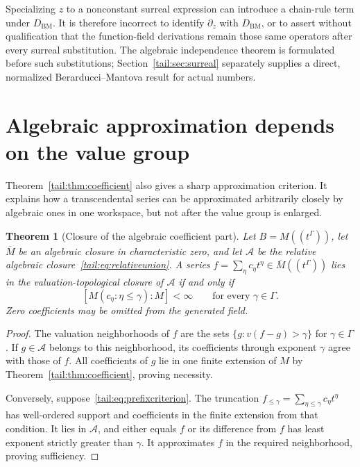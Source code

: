\documentclass[11pt,a4paper]{article}
\numberwithin{equation}{section}
\newtheorem{theorem}{Theorem}[section]
\theoremstyle{definition}
\theoremstyle{remark}
\newcommand{\BM}{D_{\mathrm{BM}}}
\begin{document}
Specializing $z$ to a nonconstant surreal expression can introduce a
chain-rule term under $\BM$. It is therefore incorrect to identify
$\partial_z$ with $\BM$, or to assert without qualification that the
function-field derivations remain those same operators after every
surreal substitution. The algebraic independence theorem is formulated
before such substitutions; Section~\ref{tail:sec:surreal} separately supplies
a direct, normalized Berarducci--Mantova result for actual numbers.

\section{Algebraic approximation depends on the value group}\label{tail:sec:approx}

Theorem~\ref{tail:thm:coefficient} also gives a sharp approximation criterion.
It explains how a transcendental series can be approximated arbitrarily
closely by algebraic ones in one workspace, but not after the value group
is enlarged.

\begin{theorem}[Closure of the algebraic coefficient part]\label{tail:thm:closure}
Let $B=M((t^\Gamma))$, let $\overline M$ be an algebraic closure in
characteristic zero, and let $\mathcal A$ be the relative algebraic
closure~\eqref{tail:eq:relativeunion}. A series
$f=\sum_\eta c_\eta t^\eta\in\overline M((t^\Gamma))$ lies in the
valuation-topological closure of $\mathcal A$ if and only if
\begin{equation}\label{tail:eq:prefixcriterion}
 [M(c_\eta:\eta\leq\gamma):M]<\infty
                    \qquad\text{for every }\gamma\in\Gamma.
\end{equation}
Zero coefficients may be omitted from the generated field.
\end{theorem}
\begin{proof}
The valuation neighborhoods of $f$ are the sets
$\{g:v(f-g)>\gamma\}$ for $\gamma\in\Gamma$.
If $g\in\mathcal A$ belongs to this neighborhood, its coefficients
through exponent $\gamma$ agree with those of $f$. All coefficients of
$g$ lie in one finite extension of $M$ by
Theorem~\ref{tail:thm:coefficient}, proving necessity.

Conversely, suppose~\eqref{tail:eq:prefixcriterion}. The truncation
$f_{\leq\gamma}=\sum_{\eta\leq\gamma}c_\eta t^\eta$ has well-ordered
support and coefficients in the finite extension from that condition.
It lies in $\mathcal A$, and either equals $f$ or its difference from $f$
has least exponent strictly greater than $\gamma$. It approximates $f$
in the required neighborhood, proving sufficiency.
\end{proof}
\end{document}
